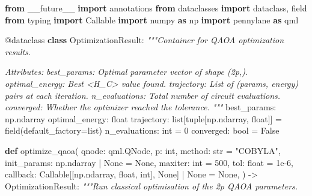 \documentclass[
  11pt,
]{report}
\newenvironment{Shaded}{}{}
\newcommand{\AttributeTok}[1]{\textcolor[rgb]{0.49,0.56,0.16}{#1}}
\newcommand{\BuiltInTok}[1]{\textcolor[rgb]{0.00,0.50,0.00}{#1}}
\newcommand{\CommentTok}[1]{\textcolor[rgb]{0.38,0.63,0.69}{\textit{#1}}}
\newcommand{\DecValTok}[1]{\textcolor[rgb]{0.25,0.63,0.44}{#1}}
\newcommand{\FloatTok}[1]{\textcolor[rgb]{0.25,0.63,0.44}{#1}}
\newcommand{\ImportTok}[1]{\textcolor[rgb]{0.00,0.50,0.00}{\textbf{#1}}}
\newcommand{\KeywordTok}[1]{\textcolor[rgb]{0.00,0.44,0.13}{\textbf{#1}}}
\newcommand{\NormalTok}[1]{#1}
\newcommand{\OperatorTok}[1]{\textcolor[rgb]{0.40,0.40,0.40}{#1}}
\newcommand{\StringTok}[1]{\textcolor[rgb]{0.25,0.44,0.63}{#1}}
\newcommand{\VariableTok}[1]{\textcolor[rgb]{0.10,0.09,0.49}{#1}}
\begin{document}
\begin{Shaded}
\begin{Highlighting}[]
\ImportTok{from}\NormalTok{ \_\_future\_\_ }\ImportTok{import}\NormalTok{ annotations}
\ImportTok{from}\NormalTok{ dataclasses }\ImportTok{import}\NormalTok{ dataclass, field}
\ImportTok{from}\NormalTok{ typing }\ImportTok{import}\NormalTok{ Callable}
\ImportTok{import}\NormalTok{ numpy }\ImportTok{as}\NormalTok{ np}
\ImportTok{import}\NormalTok{ pennylane }\ImportTok{as}\NormalTok{ qml}


\AttributeTok{@dataclass}
\KeywordTok{class}\NormalTok{ OptimizationResult:}
    \CommentTok{"""Container for QAOA optimization results.}

\CommentTok{    Attributes:}
\CommentTok{        best\_params: Optimal parameter vector of shape (2p,).}
\CommentTok{        optimal\_energy: Best \textless{}H\_C\textgreater{} value found.}
\CommentTok{        trajectory: List of (params, energy) pairs at each iteration.}
\CommentTok{        n\_evaluations: Total number of circuit evaluations.}
\CommentTok{        converged: Whether the optimizer reached the tolerance.}
\CommentTok{    """}
\NormalTok{    best\_params: np.ndarray}
\NormalTok{    optimal\_energy: }\BuiltInTok{float}
\NormalTok{    trajectory: }\BuiltInTok{list}\NormalTok{[}\BuiltInTok{tuple}\NormalTok{[np.ndarray, }\BuiltInTok{float}\NormalTok{]] }\OperatorTok{=}\NormalTok{ field(default\_factory}\OperatorTok{=}\BuiltInTok{list}\NormalTok{)}
\NormalTok{    n\_evaluations: }\BuiltInTok{int} \OperatorTok{=} \DecValTok{0}
\NormalTok{    converged: }\BuiltInTok{bool} \OperatorTok{=} \VariableTok{False}


\KeywordTok{def}\NormalTok{ optimize\_qaoa(}
\NormalTok{    qnode: qml.QNode,}
\NormalTok{    p: }\BuiltInTok{int}\NormalTok{,}
\NormalTok{    method: }\BuiltInTok{str} \OperatorTok{=} \StringTok{"COBYLA"}\NormalTok{,}
\NormalTok{    init\_params: np.ndarray }\OperatorTok{|} \VariableTok{None} \OperatorTok{=} \VariableTok{None}\NormalTok{,}
\NormalTok{    maxiter: }\BuiltInTok{int} \OperatorTok{=} \DecValTok{500}\NormalTok{,}
\NormalTok{    tol: }\BuiltInTok{float} \OperatorTok{=} \FloatTok{1e{-}6}\NormalTok{,}
\NormalTok{    callback: Callable[[np.ndarray, }\BuiltInTok{float}\NormalTok{, }\BuiltInTok{int}\NormalTok{], }\VariableTok{None}\NormalTok{] }\OperatorTok{|} \VariableTok{None} \OperatorTok{=} \VariableTok{None}\NormalTok{,}
\NormalTok{) }\OperatorTok{{-}\textgreater{}}\NormalTok{ OptimizationResult:}
    \CommentTok{"""Run classical optimisation of the 2p QAOA parameters.}


\end{Highlighting}
\end{Shaded}
\end{document}
